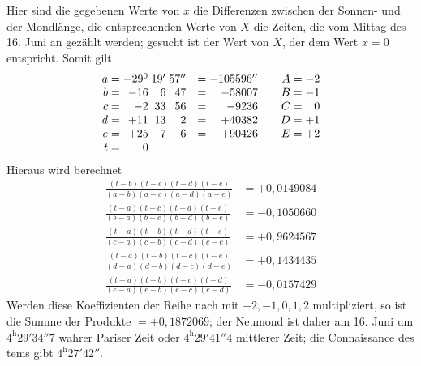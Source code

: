 Hier sind die gegebenen Werte von \(x\) die Differenzen zwischen der Sonnen- und der Mondlänge, die entsprechenden Werte von \(X\) die Zeiten, die vom Mittag des 16. Juni an gezählt werden; gesucht ist der Wert von \(X\), der dem Wert \(x=0\) entspricht. Somit gilt
\[
\begin{array}{r@{\;}c@{\;}r@{\;}r@{\;}r@{\quad}c@{\;}r@{\qquad}r@{\;}c@{\;}r}
a&=&-29^{0}&19'&57''&=&-105596''&A&=&-2\\
b&=&-16&6&47&=&-58007&B&=&-1\\
c&=&-2&33&56&=&-9236&C&=&0\\
d&=&+11&13&2&=&+40382&D&=&+1\\
e&=&+25&7&6&=&+90426&E&=&+2\\
t&=&0&&&&&&&
\end{array}
\]
Hieraus wird berechnet
\[
\begin{aligned}
\frac{(t-b)(t-c)(t-d)(t-e)}{(a-b)(a-c)(a-d)(a-e)}&=+0{,}0149084\\[5pt]
\frac{(t-a)(t-c)(t-d)(t-e)}{(b-a)(b-c)(b-d)(b-e)}&=-0{,}1050660\\[5pt]
\frac{(t-a)(t-b)(t-d)(t-e)}{(c-a)(c-b)(c-d)(c-e)}&=+0{,}9624567\\[5pt]
\frac{(t-a)(t-b)(t-c)(t-e)}{(d-a)(d-b)(d-c)(d-e)}&=+0{,}1434435\\[5pt]
\frac{(t-a)(t-b)(t-c)(t-d)}{(e-a)(e-b)(e-c)(e-d)}&=-0{,}0157429
\end{aligned}
\]
Werden diese Koeffizienten der Reihe nach mit \(-2,-1,0,1,2\) multipliziert, so ist die Summe der Produkte
\(=+0{,}1872069\); der Neumond ist daher am 16. Juni um \(4^{\mathrm h}29'34''7\) wahrer Pariser
Zeit oder \(4^{\mathrm h}29'41''4\) mittlerer Zeit; die Connaissance des tems gibt \(4^{\mathrm h}27'42''\).

